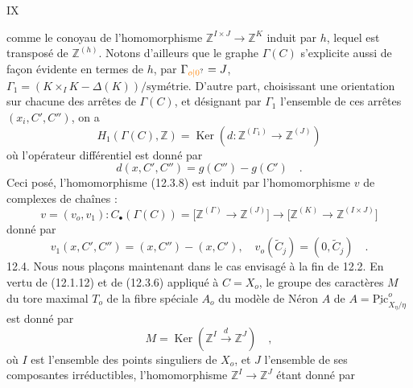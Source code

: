 \hfill IX

comme le conoyau de l'homomorphisme $\mathbb{Z}^{I\times J}\longrightarrow\mathbb{Z}^K$ induit par $h$, lequel est transposé de $\mathbb{Z}^{(h)}$. Notons d'ailleurs que le graphe $\Gamma(C)$ s'explicite aussi de façon évidente en termes de $h$, par $\Gamma_{\unsure{o|0}}=J$, $\Gamma_1=(K\times_I K-\Delta(K))/\text{symétrie}$. D'autre part, choisissant une orientation sur chacune des arrêtes de $\Gamma(C)$, et désignant par $\Gamma_1$ l'ensemble de ces arrêtes $(x_i,C',C'')$, on a
\[
 H_1(\Gamma(C),\mathbb{Z})=\operatorname{Ker}(d:\mathbb{Z}^{(\Gamma_1)}\longrightarrow\mathbb{Z}^{(J)})\tag*{(12.3.11)}
\]
où l'opérateur différentiel est donné par
\[
 d(x,C',C'')=g(C'')-g(C')\quad .\tag*{(12.3.12)}
\]
Ceci posé, l'homomorphisme (12.3.8) est induit par l'homomorphisme $v$ de complexes de chaînes :
\[
 v=(v_o,v_1):C_{\bullet}(\Gamma(C))=
 \big[\mathbb{Z}^{(\Gamma)}\longrightarrow\mathbb{Z}^{(J)}\big]\longrightarrow
 \big[\mathbb{Z}^{(K)}\longrightarrow\mathbb{Z}^{(I\times J)}\big]\tag*{(12.3.13)}
\]
donné par
\[
 v_1(x,C',C'')=(x,C'')-(x,C'),\quad v_o(\widetilde C_j)=(0,\widetilde C_j)\quad .\tag*{(12.3.14)}
\]
12.4. Nous nous plaçons maintenant dans le cas envisagé à la fin de 12.2. En vertu de (12.1.12) et de (12.3.6) appliqué à $C=X_o$, le groupe des caractères $M$ du tore maximal $T_o$ de la fibre spéciale $A_o$ du modèle de Néron $A$ de $A=\underline{\mathrm{Pic}}^o_{X_\eta/\eta}$ est donné par
\[
 M=\operatorname{Ker}(\mathbb{Z}^I\xrightarrow{d}\mathbb{Z}^J)\quad ,\tag*{(12.4.1)}
\]
où $I$ est l'ensemble des points singuliers de $X_o$, et $J$ l'ensemble de ses composantes irréductibles, l'homomorphisme $\mathbb{Z}^I\longrightarrow\mathbb{Z}^J$ étant donné par

